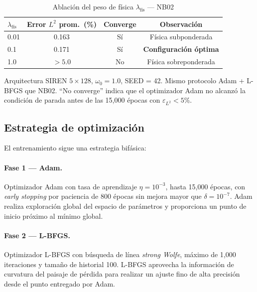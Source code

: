 \begin{table}[htbp]
\centering
\begin{threeparttable}
\caption{Ablación del peso de física $\lambda_{\mathrm{fís}}$ --- NB02}
\label{tab:ablacion_lambda}
\begin{tabular}{lccc}
\toprule
$\lambda_{\mathrm{fís}}$ & Error $L^2$ prom.\ (\%) & Converge & Observación \\
\midrule
0.01  & 0.163 & Sí & Física subponderada \\
0.1   & 0.171 & Sí & \textbf{Configuración óptima} \\
1.0   & $>5.0$ & No & Física sobreponderada \\
\bottomrule
\end{tabular}
\begin{tablenotes}
\small
\item Arquitectura SIREN $5\times128$, $\omega_0 = 1.0$, SEED = 42.
      Mismo protocolo Adam + L-BFGS que NB02.
      ``No converge'' indica que el optimizador Adam no alcanzó la condición
      de parada antes de las 15{,}000 épocas con $\varepsilon_{L^2} < 5\%$.
\end{tablenotes}
\end{threeparttable}
\end{table}

\subsection{Estrategia de optimización}
\label{subsec:optimizacion}

El entrenamiento sigue una estrategia bifásica:

\paragraph{Fase 1 --- Adam.}
Optimizador Adam con tasa de aprendizaje $\eta = 10^{-3}$, hasta 15{,}000 épocas,
con \textit{early stopping} por paciencia de 800 épocas sin mejora mayor que
$\delta = 10^{-7}$.
Adam realiza exploración global del espacio de parámetros y proporciona un punto
de inicio próximo al mínimo global.

\paragraph{Fase 2 --- L-BFGS.}
Optimizador L-BFGS con búsqueda de línea \textit{strong Wolfe}, máximo de 1{,}000
iteraciones y tamaño de historial 100.
L-BFGS aprovecha la información de curvatura del paisaje de pérdida para realizar
un ajuste fino de alta precisión desde el punto entregado por Adam.

